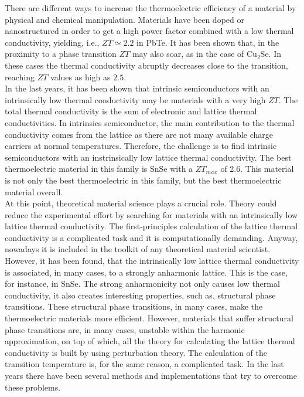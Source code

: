There are different ways to increase the thermoelectric efficiency of a material by physical and chemical 
manipulation. Materials have been doped\cite{kim2013engineered,pei2011stabilizing,heremans2008enhancement} or
nanostructured\cite{vineis2010nanostructured,minnich2009bulk} in order to get a high power factor combined with a 
low thermal conductivity, yielding, i.e., $ZT\simeq 2.2$ in PbTe\cite{hsu2004cubic}. It has been shown that, in the 
proximity to a phase transition $ZT$ may also soar, as in the case of Cu$_{2}$Se\cite{liu2013ultrahigh}. In these 
cases the thermal conductivity abruptly decreases close to the transition, reaching $ZT$ values as high as $2.5$. \\

In the last years, it has been shown that intrinsic semiconductors with an intrinsically low thermal conductivity 
may be materials with a very high $ZT$\cite{zhao2014ultralow,he2018remarkable}. The total thermal conductivity is 
the sum of electronic and lattice thermal conductivities. In intrinsics semiconductor, the main contribution to the 
thermal conductivity comes from the lattice as there are not many available charge carriers at normal temperatures. 
Therefore, the challenge is to find intrinsic semiconductors with an instrinsically low lattice thermal conductivity. 
The best thermoelectric material in this family is SnSe\cite{zhao2014ultralow} with a $ZT_{max}$ of 2.6. This 
material is not only the best thermoelectric in this family, but the best thermoelectric material overall. \\

At this point, theoretical material science plays a crucial role. Theory could reduce the experimental effort by 
searching for materials with an intrinsically low lattice thermal conductivity. The first-principles calculation of 
the lattice thermal conductivity is a complicated task and it is computationally demanding\cite{broido2007intrinsic}. 
Anyway, nowadays it is included in the toolkit\cite{giannozzi2009quantum} of any theoretical material scientist. 
However, it has been found, that the intrinsically low lattice thermal conductivity is associated, in many cases, to 
a strongly anharmonic lattice\cite{zhao2014ultralow,ribeiro2018strong}. This is the case, for instance, in SnSe. The 
strong anharmonicity not only causes low thermal conductivity, it also creates interesting properties, such as, 
structural phase transitions. These structural phase transitions, in many cases, make the thermoelectric materials 
more efficient\cite{liu2013ultrahigh}. However, materials that suffer structural phase transitions are, in many 
cases, unstable within the harmonic approximation, on top of which, all the theory for calculating the 
lattice thermal conductivity is built by using perturbation theory\cite{paulatto2013anharmonic}. The calculation of 
the transition temperature is, for the same reason, a complicated task. In the last years there have been several 
methods and implementations\cite{hellman2013temperature,ljungberg2013temperature,magduau2013identification} that try 
to overcome these problems. \\

